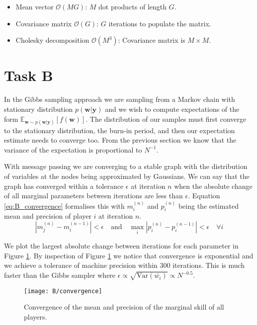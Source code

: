 \documentclass[11pt]{article}
\begin{document}
\begin{itemize}
    \itemsep0em 
    \item Mean vector $\mathcal{O}(MG)$: $M$ dot products of length $G$.
    \item Covariance matrix $\mathcal{O}(G)$: $G$ iterations to populate the matrix.
    \item Cholesky decomposition $\mathcal{O}(M^3)$: Covariance matrix is $M \times M$.
\end{itemize}


\section{Task B}

In the Gibbs sampling approach we are sampling from a Markov chain with stationary distribution $p(\mathbf{w}|\mathbf{y})$ and we wish to compute expectations of the form $\mathbb{E}_{\mathbf{w} \sim p(\mathbf{w}|\mathbf{y})}[f(\mathbf{w})]$. The distribution of our samples must first converge to the stationary distribution, the burn-in period, and then our expectation estimate needs to converge too. From the previous section we know that the variance of the expectation is proportional to $N^{-1}$.

With message passing we are converging to a stable graph with the distribution of variables at the nodes being approximated by Gaussians. We can say that the graph has converged within a tolerance $\epsilon$ at iteration $n$ when the absolute change of all marginal parameters between iterations are less than $\epsilon$. Equation \ref{eq:B_convergence} formalises this with $m_i^{(n)}$ and $p_i^{(n)}$ being the estimated mean and precision of player $i$ at iteration $n$.
\begin{equation}
    |m_j^{(n)} - m_i^{(n-1)}| < \epsilon \quad \text{and} \quad \max_{i} |p_i^{(n)} - p_i^{(n-1)}| < \epsilon \quad \forall i
    \label{eq:B_convergence}
\end{equation}

We plot the largest absolute change between iterations for each parameter in Figure \ref{fig:B_convergence}. By inspection of Figure \ref{fig:B_convergence} we notice that convergence is exponential and we achieve a tolerance of machine precision within 300 iterations. This is much faster than the Gibbs sampler where $\epsilon \propto \sqrt{\text{Var}(\bar{w_i})} \propto N^{-0.5}$.

\begin{figure}[h]
    \centering
    \texttt{[image: B/convergence]} 
    \caption{Convergence of the mean and precision of the marginal skill of all players.}
    \label{fig:B_convergence}
\end{figure}
\end{document}
